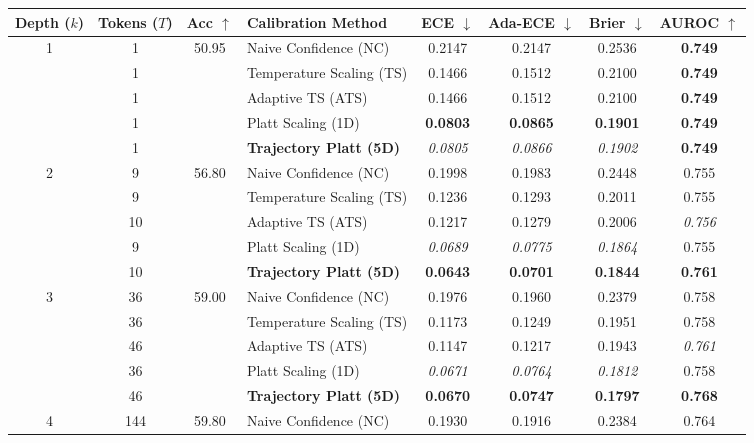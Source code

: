 \begin{table}[t]
\setlength{\tabcolsep}{4pt}
\renewcommand{\arraystretch}{1.05}
\centering
\footnotesize
\begin{tabular}{ccclcccc}
\toprule
\textbf{Depth ($k$)} & \textbf{Tokens ($T$)} & \textbf{Acc} $\uparrow$ & \textbf{Calibration Method} & \textbf{ECE} $\downarrow$ & \textbf{Ada-ECE} $\downarrow$ & \textbf{Brier} $\downarrow$ & \textbf{AUROC} $\uparrow$ \\
\midrule
\multirow{5}{*}{1} & 1 & \multirow{5}{*}{50.95} & Naive Confidence (NC) & 0.2147 & 0.2147 & 0.2536 & \textbf{0.749} \\
 & 1 &  & Temperature Scaling (TS) & 0.1466 & 0.1512 & 0.2100 & \textbf{0.749} \\
 & 1 &  & Adaptive TS (ATS) & 0.1466 & 0.1512 & 0.2100 & \textbf{0.749} \\
 & 1 &  & Platt Scaling (1D) & \textbf{0.0803} & \textbf{0.0865} & \textbf{0.1901} & \textbf{0.749} \\
 & 1 &  & \textbf{Trajectory Platt (5D)} & \textit{0.0805} & \textit{0.0866} & \textit{0.1902} & \textbf{0.749} \\
\midrule
\multirow{5}{*}{2} & 9 & \multirow{5}{*}{56.80} & Naive Confidence (NC) & 0.1998 & 0.1983 & 0.2448 & 0.755 \\
 & 9 &  & Temperature Scaling (TS) & 0.1236 & 0.1293 & 0.2011 & 0.755 \\
 & 10 &  & Adaptive TS (ATS) & 0.1217 & 0.1279 & 0.2006 & \textit{0.756} \\
 & 9 &  & Platt Scaling (1D) & \textit{0.0689} & \textit{0.0775} & \textit{0.1864} & 0.755 \\
 & 10 &  & \textbf{Trajectory Platt (5D)} & \textbf{0.0643} & \textbf{0.0701} & \textbf{0.1844} & \textbf{0.761} \\
\midrule
\multirow{5}{*}{3} & 36 & \multirow{5}{*}{59.00} & Naive Confidence (NC) & 0.1976 & 0.1960 & 0.2379 & 0.758 \\
 & 36 &  & Temperature Scaling (TS) & 0.1173 & 0.1249 & 0.1951 & 0.758 \\
 & 46 &  & Adaptive TS (ATS) & 0.1147 & 0.1217 & 0.1943 & \textit{0.761} \\
 & 36 &  & Platt Scaling (1D) & \textit{0.0671} & \textit{0.0764} & \textit{0.1812} & 0.758 \\
 & 46 &  & \textbf{Trajectory Platt (5D)} & \textbf{0.0670} & \textbf{0.0747} & \textbf{0.1797} & \textbf{0.768} \\
\midrule
\multirow{5}{*}{4} & 144 & \multirow{5}{*}{59.80} & Naive Confidence (NC) & 0.1930 & 0.1916 & 0.2384 & 0.764 \\

\end{tabular}
\end{table}

